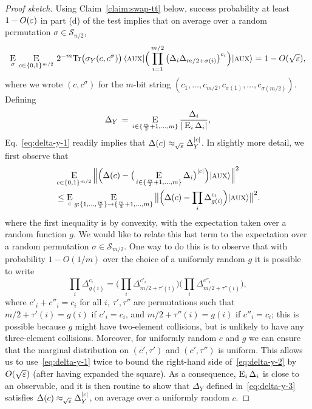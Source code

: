 \begin{proof}[Proof sketch]
Using Claim~\ref{claim:swap-tt} below, success probability at least $1-O(\varepsilon)$ in part (d) of the test implies that on average over a random permutation $\sigma \in \mathcal{S}_{n/2}$, 
\begin{equation}\label{eq:delta-y-1}
 \mathop{\textsc{E}}_{\sigma} \,\mathop{\textsc{E}}_{c\in\{0,1\}^{m/2}}\,2^{-m}\mbox{\rm Tr} \big(\sigma_Y(c,c^\sigma)\big)\,\langle\textsc {aux}| \Big( \prod_{i=1}^{m/2}\big( \Delta_i \Delta_{m/2+ \sigma(i)} \big)^{c_i} \Big) |\textsc {aux}\rangle  = 1- O(\sqrt{\varepsilon}),
\end{equation}
where we wrote $(c,c^\sigma)$ for the $m$-bit string $(c_1,\ldots,c_{m/2},c_{\sigma(1)},\ldots,c_{\sigma(m/2)})$. Defining
 \begin{equation}\label{eq:delta-y-3}
\Delta_Y \,=\, \mathop{\textsc{E}}_{i\in\{\frac{m}{2}+1,\ldots,m\}} \frac{\Delta_i}{|\mathop{\textsc{E}}_{i} \Delta_i|},
\end{equation}
Eq.~\eqref{eq:delta-y-1} readily implies that $\Delta(c) \approx_{\sqrt{\varepsilon}} \Delta_Y^{|c|}$. In slightly more detail, we first observe that
\begin{align}
  &\mathop{\textsc{E}}_{c\in\{0,1\}^{m/2}} \Big\| \Big(\Delta(c) -
  \big(\mathop{\textsc{E}}_{i\in\{\frac{m}{2}+1,\ldots,m\}} \Delta_{i}\big)^{|c|}\Big) |\textsc {aux}\rangle
  \Big\|^2\\&\leq 
\mathop{\textsc{E}}_{c} \mathop{\textsc{E}}_{g:\{1,\ldots,\frac{m}{2}\}\to\{\frac{m}{2}+1,\ldots,m\}} \big\|\Big( \Delta(c) - \prod_i \Delta_{g(i)}^{c_i}\Big) |\textsc {aux}\rangle \big\|^2.\label{eq:delta-y-2}
\end{align}
where the first inequality is by convexity, with the expectation taken over a random function $g$. We would like to relate this last term to the expectation over a random permutation $\sigma\in\mathcal{S}_{m/2}$. One way to do this is to observe that with  probability $1-O(1/m)$ over the choice of a uniformly random $g$ it is possible to write
$$ \prod_i \Delta_{g(i)}^{c_i} = \Big(\prod_i \Delta_{m/2+\tau'(i)}^{c'_i}\Big)\Big(\prod_i \Delta_{m/2+\tau''(i)}^{c''_i}\Big),$$
where $c'_i+c''_i=c_i$ for all $i$, $\tau',\tau''$ are permutations such that $m/2+\tau'(i)=g(i)$ if $c'_i=c_i$, and $m/2+\tau''(i)=g(i)$ if $c''_i=c_i$; this is possible because $g$ might have two-element collisions, but is unlikely to have any three-element collisions. Moreover, for uniformly random $c$ and $g$ we can ensure that the marginal distribution on $(c',\tau')$ and $(c',\tau'')$ is uniform.  This allows us to use~\eqref{eq:delta-y-1} twice to bound the right-hand side of~\eqref{eq:delta-y-2} by $O(\sqrt{\varepsilon})$ (after having expanded the square). As a consequence, $\mathop{\textsc{E}}_{i}\Delta_i$ is close to an observable, and it is then routine to show that $\Delta_Y$ defined in~\eqref{eq:delta-y-3} satisfies $\Delta(c) \approx_{\sqrt{\varepsilon}} \Delta_Y^{|c|}$, on average over a uniformly random $c$. 


\end{proof}
